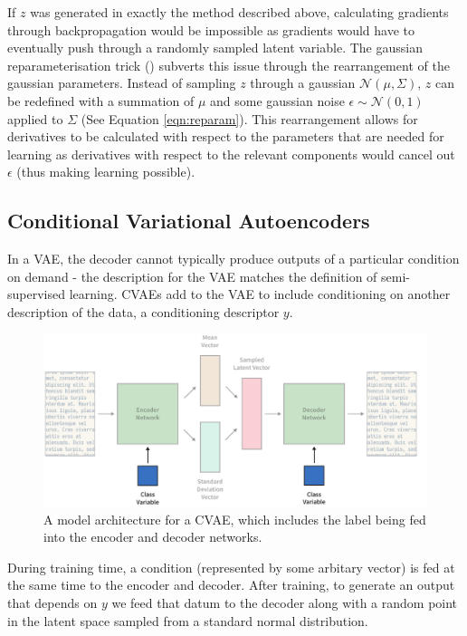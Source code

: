 \documentclass[12pt,twoside]{report}
\begin{document}
If $z$ was generated in exactly the method described above, calculating gradients through backpropagation would be impossible as gradients would have to eventually push through a randomly sampled latent variable. The gaussian reparameterisation trick (\cite{kingma_auto-encoding_2013}) subverts this issue through the rearrangement of the gaussian parameters. Instead of sampling $z$ through a gaussian $\mathcal{N}(\mu, \Sigma)$, $z$ can be redefined with a summation of $\mu$ and some gaussian noise $\epsilon \sim \mathcal{N}(0,1)$ applied to $\Sigma$ (See Equation \ref{eqn:reparam}). This rearrangement allows for derivatives to be calculated with respect to the parameters that are needed for learning as derivatives with respect to the relevant components would cancel out $\epsilon$ (thus making learning possible).

\subsection{Conditional Variational Autoencoders}
\label{conditional_variational_autoencoders}
In a VAE, the decoder cannot typically produce outputs of a particular condition on demand - the description for the VAE matches the definition of semi-supervised learning. CVAEs add to the VAE to include conditioning on another description of the data, a conditioning descriptor $y$. 

\begin{figure}[!ht]
	\centering
	\includegraphics[width=150mm]{diagrams/conditional_variational_autoencoders.pdf}
	\caption{A model architecture for a CVAE, which includes the label being fed into the encoder and decoder networks. \label{cvae_diagram}}
\end{figure}

During training time, a condition (represented by some arbitary vector) is fed at the same time to the encoder and decoder. After training, to generate an output that depends on $y$ we feed that datum to the decoder along with a random point in the latent space sampled from a standard normal distribution.
\end{document}
